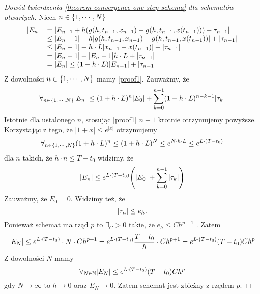 \documentclass[12pt,a4paper]{report}
\begin{document}
\begin{proof}[Dowód twierdzenia \ref{theorem-convergence-one-step-schema} dla schematów otwartych]
Niech $n \in \left\lbrace {1,\cdots,N} \right\rbrace $ 
\begin{equation}
\begin{array}{rl}
{\left| {E_n} \right|} &= {\left| {E_{n-1} + h(g(h,t_{n-1},x_{n-1}) - g(h,t_{n-1},x(t_{n-1}))) - \tau_{n-1}} \right|} \\
&\leq {\left| {E_n-1} \right|} + h {\left| {g(h,t_{n-1},x_{n-1}) - g(h,t_{n-1},x(t_{n-1}))} \right|} + {\left| { \tau_{n-1}} \right|}\\
&\leq {\left| {E_n-1} \right|} + h \cdot L {\left| {x_{n-1} - x(t_{n-1})} \right|} + {\left| { \tau_{n-1}} \right|}\\
&= {\left| {E_n-1} \right|} + {\left| {E_n-1} \right|} h \cdot L + {\left| { \tau_{n-1}} \right|}\\
&= {\left| {E_n} \right|} \leq (1 + h \cdot L) {\left| {E_{n-1}} \right|} + {\left| {\tau_{n-1}} \right|} 
\end{array}
\end{equation}
Z dowolności $n \in \left\lbrace {1, \cdots, N} \right\rbrace$ mamy \ref{proof1}. 
Zauważmy, że 
$$
\forall_{n \in \set{1,\cdots,N}} \abs{E_n} \leq (1 + h \cdot L)^{n} \abs{E_0} + \sum_{k=0}^{n-1} (1+ h \cdot L)^{n-k-1} \abs{\tau_k} 
$$
Istotnie dla ustalonego $n$, stosując \ref{proof1} $n-1$ krotnie otrzymujemy powyższe. Korzystając z tego, że $|1+x|\leqslant e^{|x|}$ otrzymujemy
$$
\forall_{n \in \left\lbrace {1,\cdots,N} \right\rbrace}(1 + h \cdot L)^{n} \leq (1 + h \cdot L)^{N} \leq e^{N \cdot h \cdot L} \leq e^{L \cdot (T-t_0)} 
$$
dla $n$ takich, że $h\cdot n\leq  T - t_0 $ widzimy, że
$$
\abs{E_n} \leq e^{L \cdot (T-t_0)} \bracket{\abs{E_0} + \sum_{k=0}^{n-1}\abs{\tau_k}}
$$
Zauważmy, że $E_0 = 0$. Widzimy też, że 
$$
{\left| {\tau_n} \right|} \leq e_h.
$$
Ponieważ schemat ma rząd $p$ to $\exists_C>0$ takie, że $e_h \leq Ch^{p+1} $ . Zatem
$$
{\left| {E_N} \right|} \leq  e^{L \cdot (T-t_0)} \cdot N \cdot Ch^{p+1}
= e^{L \cdot (T-t_0)} \frac{T-t_0}{h} \cdot Ch^{p+1}
= e^{L \cdot (T-t_0)} (T-t_0) Ch^p
$$
Z dowolności $N$ mamy
$$
\forall_{N \in \mathbb{N}} {\left| {E_N} \right|} \leq e^{L \cdot (T-t_0)} (T-t_0) Ch^p
$$
gdy $ N \to \infty $ to $ h \to 0 $ oraz $ E_N \to 0$. Zatem schemat jest zbieżny z rzędem $p$.
\end{proof}
\end{document}
